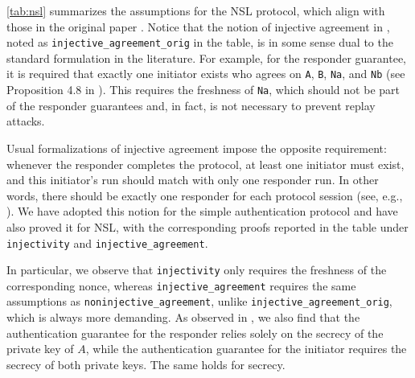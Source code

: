  \cref{tab:nsl} summarizes the assumptions for the NSL protocol, which align with those in the original paper \cite{FHG98}. Notice that the notion of injective agreement in \cite{FHG98}, noted as \lstinline|injective_agreement_orig| in the table, is in some sense dual to the standard formulation in the literature. For example, for the responder guarantee, it is required that exactly one initiator exists who agrees on \lstinline|A|, \lstinline|B|, \lstinline|Na|, and \lstinline|Nb| (see Proposition 4.8 in \cite{FHG98}). This requires the freshness of \lstinline|Na|, which should not be part of the responder guarantees and, in fact, is not necessary to prevent replay attacks.

Usual formalizations of injective agreement impose the opposite requirement: whenever the responder completes the protocol, at least one initiator must exist, and this initiator's run should match with only one responder run. In other words, there should be exactly one responder for each protocol session (see, e.g., \cite{tamarinmanual}). We have adopted this notion for the simple authentication protocol and have also proved it for NSL, with the corresponding proofs reported in the table under \lstinline|injectivity| and \lstinline|injective_agreement|.

In particular, we observe that \lstinline|injectivity| only requires the freshness of the corresponding nonce, whereas \lstinline|injective_agreement| requires the same assumptions as \lstinline|noninjective_agreement|, unlike \lstinline|injective_agreement_orig|, which is always more demanding. As observed in \cite{FHG98}, we also find that the authentication guarantee for the responder relies solely on the secrecy of the private key of $A$, while the authentication guarantee for the initiator requires the secrecy of both private keys. The same holds for secrecy.





